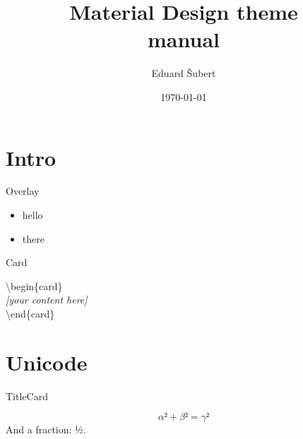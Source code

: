 \documentclass{beamer}
\title{Material Design theme \\manual}
\date{\today}
\author[Šubert]{Eduard Šubert}
\begin{document}
\begin{frame}
\titlepage{}
\end{frame}

\section{Intro}

\begin{frame}{Overlay}
    \begin{card}
        \begin{itemize}[<+->]
            \item hello
            \item there
        \end{itemize}
    \end{card}
\end{frame}

\begin{frame}{Card}
    \begin{card}
        {\color{accent} \textbackslash{}begin\{card\}\\[2mm]}
        \null\qquad \textit{[your content here]}\\[2mm]
        {\color{accent} \textbackslash{}end\{card\}}
    \end{card}
\end{frame}

\section{Unicode}

\begin{frame}{TitleCard}
    \begin{card}
        \begin{equation}
            α² + β² = γ²
        \end{equation}
        And a fraction: ½.
    \end{card}
\end{frame}
\end{document}
